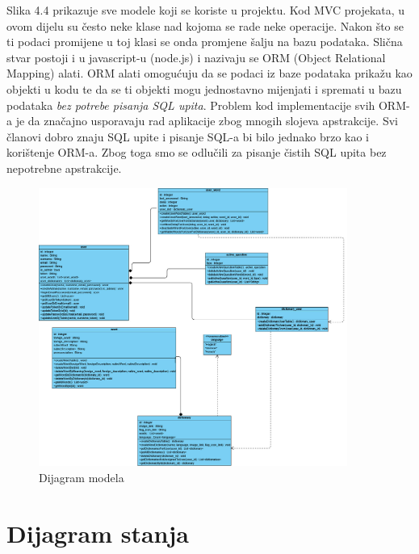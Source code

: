 			\eject
            Slika 4.4 prikazuje sve modele koji se koriste u projektu. Kod MVC projekata, u ovom dijelu su često neke klase nad kojoma se rade neke operacije. Nakon što se ti podaci promijene u toj klasi se onda promjene šalju na bazu podataka.
            Slična stvar postoji i u javascript-u (node.js) i nazivaju se ORM (Object Relational Mapping) alati. ORM alati omogućuju da se podaci iz baze podataka prikažu kao objekti u kodu te da se ti objekti mogu jednostavno mijenjati i spremati u bazu podataka \textit{bez potrebe pisanja SQL upita}.
            Problem kod implementacije svih ORM-a je da značajno usporavaju rad aplikacije zbog mnogih slojeva apstrakcije. Svi članovi dobro znaju SQL upite i pisanje SQL-a bi bilo jednako brzo kao i korištenje ORM-a. Zbog toga smo se odlučili za pisanje čistih SQL upita bez nepotrebne apstrakcije.
				\begin{figure}[H]
					\includegraphics[width=0.9\textwidth]{dijagrami/slika3.jpg} 
					\centering
					\caption{Dijagram modela}
					\label{fig:class_diagram}
				\end{figure}			
			\eject
			
		\section{Dijagram stanja}
			
